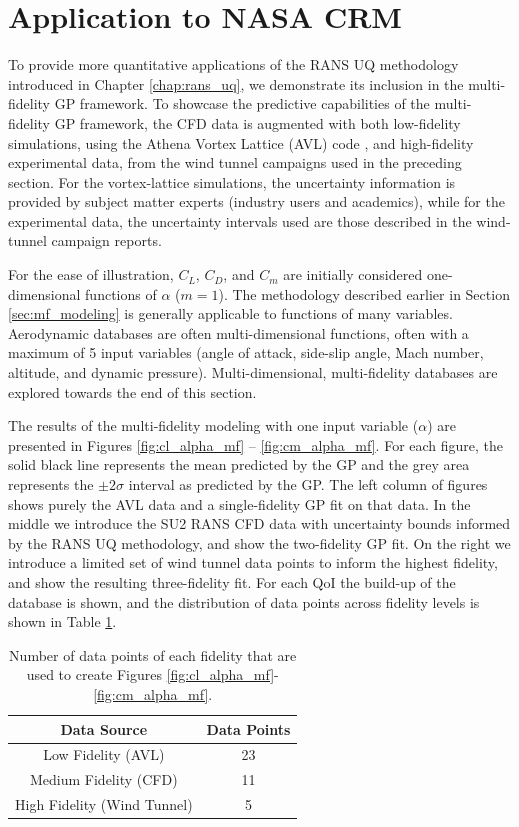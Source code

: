 \section{Application to NASA CRM} \label{sec:mf_gp_nasa_crm}

To provide more quantitative applications of the RANS UQ methodology introduced in Chapter \ref{chap:rans_uq}, we demonstrate its inclusion in the multi-fidelity GP framework. To showcase the predictive capabilities of the multi-fidelity GP framework, the CFD data is augmented with both low-fidelity simulations, using the Athena Vortex Lattice (AVL) code \cite{drela2008athena}, and high-fidelity experimental data, from the wind tunnel campaigns \cite{rivers_further_2012,rivers_experimental_2010} used in the preceding section. For the vortex-lattice simulations, the uncertainty information is provided by subject matter experts (industry users and academics), while for the experimental data, the uncertainty intervals used are those described in the wind-tunnel campaign reports. 

For the ease of illustration, $C_L$, $C_D$, and $C_m$ are initially considered one-dimensional functions of $\alpha$ ($m = 1$). The methodology described earlier in Section \ref{sec:mf_modeling} is generally applicable to functions of many variables. Aerodynamic databases are often multi-dimensional functions, often with a maximum of 5 input variables (angle of attack, side-slip angle, Mach number, altitude, and dynamic pressure). Multi-dimensional, multi-fidelity databases are explored towards the end of this section. 

The results of the multi-fidelity modeling with one input variable ($\alpha$) are presented in Figures \ref{fig:cl_alpha_mf} -- \ref{fig:cm_alpha_mf}. For each figure, the solid black line represents the mean predicted by the GP and the grey area represents the $\pm 2\sigma$ interval as predicted by the GP. The left column of figures shows purely the AVL data and a single-fidelity GP fit on that data. In the middle we introduce the SU2 RANS CFD data with uncertainty bounds informed by the RANS UQ methodology, and show the two-fidelity GP fit. On the right we introduce a limited set of wind tunnel data points to inform the highest fidelity, and show the resulting three-fidelity fit. For each QoI the build-up of the database is shown, and the distribution of data points across fidelity levels is shown in Table \ref{table:data_points}.

\begin{table}
\centering
    \captionsetup{justification=centering}
    \caption{Number of data points of each fidelity that are used to create Figures \ref{fig:cl_alpha_mf}-\ref{fig:cm_alpha_mf}.} 
    \begin{tabular}{|c|c|}
        \hline
        Data Source & Data Points \\ \hline \hline
        Low Fidelity (AVL) & 23 \\ \hline
        Medium Fidelity (CFD) & 11 \\ \hline 
        High Fidelity (Wind Tunnel) & 5 \\ \hline 
    \end{tabular}
    \label{table:data_points}
\end{table}

